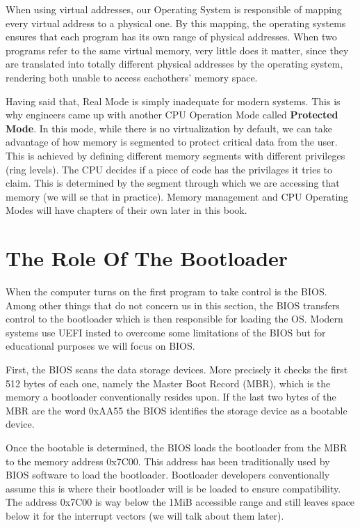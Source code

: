 When using virtual addresses, our Operating System is responsible of mapping every virtual address to a physical one.
By this mapping, the operating systems ensures that each program has its own range of physical addresses.
When two programs refer to the same virtual memory, very little does it matter, since they are translated into 
totally different physical addresses by the operating system, rendering both unable to access eachothers' memory space.

Having said that, Real Mode is simply inadequate for modern systems. This is why engineers came up with another CPU 
Operation Mode called \textbf{Protected Mode}. In this mode, while there is no virtualization by default, we can 
take advantage of how memory is segmented to protect critical data from the user. This is achieved by defining different 
memory segments with different privileges (ring levels). The CPU decides if a piece of code has the privilages 
it tries to claim. This is determined by the segment through which we are accessing that memory (we will se that in
practice). Memory management and CPU Operating Modes will have chapters of their own later in this book.

\section{The Role Of The Bootloader}

When the computer turns on the first program to take control is the BIOS. Among other things that do not concern us in 
this section, the BIOS transfers control to the bootloader which is then responsible for loading the OS. Modern systems 
use UEFI insted to overcome some limitations of the BIOS but for educational purposes we will focus on BIOS.

First, the BIOS scans the data storage devices. More precisely it checks the first 512 bytes of each one, namely the Master Boot Record 
(MBR), which is the memory a bootloader conventionally resides upon. If the last two bytes of the MBR are the word 0xAA55 the BIOS 
identifies the storage device as a bootable device.

Once the bootable is determined, the BIOS loads the bootloader from the MBR to the memory address 0x7C00. This address has been
traditionally used by BIOS software to load the bootloader. Bootloader developers conventionally assume this is where their 
bootloader will is be loaded to ensure compatibility. The address 0x7C00 is way below the 1MiB accessible range and still leaves 
space below it for the interrupt vectors (we will talk about them later).

